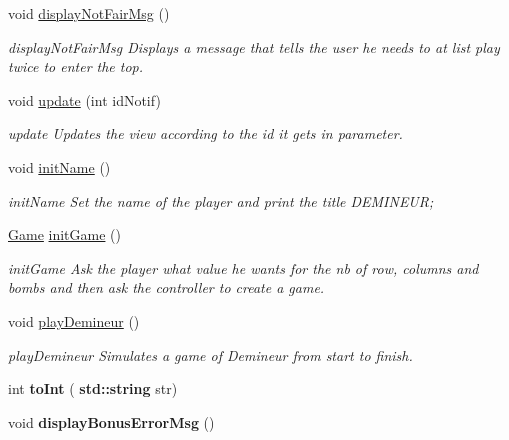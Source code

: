 \begin{DoxyCompactItemize}
\mbox{\label{class_view_af5ee195440e4674c324a5b08e7056fba}} 
void \hyperlink{class_view_af5ee195440e4674c324a5b08e7056fba}{display\+Not\+Fair\+Msg} ()
\begin{DoxyCompactList}\small\item\em display\+Not\+Fair\+Msg Displays a message that tells the user he needs to at list play twice to enter the top. \end{DoxyCompactList}\item 
void \hyperlink{class_view_a64dc507a5155d043b399d34c0fd4ab97}{update} (int id\+Notif)
\begin{DoxyCompactList}\small\item\em update Updates the view according to the id it gets in parameter. \end{DoxyCompactList}\item 
\mbox{\label{class_view_a809c631664c18f95f52af5efc0b51dda}} 
void \hyperlink{class_view_a809c631664c18f95f52af5efc0b51dda}{init\+Name} ()
\begin{DoxyCompactList}\small\item\em init\+Name Set the name of the player and print the title D\+E\+M\+I\+N\+E\+UR; \end{DoxyCompactList}\item 
\mbox{\label{class_view_aced0413d06ab5e21696039ee19b4a55f}} 
\hyperlink{class_game}{Game} \hyperlink{class_view_aced0413d06ab5e21696039ee19b4a55f}{init\+Game} ()
\begin{DoxyCompactList}\small\item\em init\+Game Ask the player what value he wants for the nb of row, columns and bombs and then ask the controller to create a game. \end{DoxyCompactList}\item 
\mbox{\label{class_view_a73e6d56f37c8bb899acd9328ed01ae1f}} 
void \hyperlink{class_view_a73e6d56f37c8bb899acd9328ed01ae1f}{play\+Demineur} ()
\begin{DoxyCompactList}\small\item\em play\+Demineur Simulates a game of Demineur from start to finish. \end{DoxyCompactList}\item 
\mbox{\label{class_view_a7db74958dcf7697ec08a1977cb7ed82b}} 
int {\bfseries to\+Int} (\textbf{ std\+::string} str)
\item 
\mbox{\label{class_view_adc8346fb19f74fd0232b36a79878c06b}} 
void {\bfseries display\+Bonus\+Error\+Msg} ()
\end{DoxyCompactItemize}
